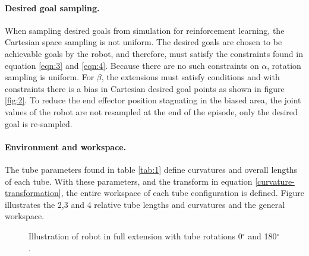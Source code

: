 \paragraph{Desired goal sampling.} When sampling desired goals from simulation for reinforcement learning, the Cartesian space sampling is not uniform. The desired goals are chosen to be achievable goals by the robot, and therefore, must satisfy the constraints found in equation \ref{eqn:3} and \ref{eqn:4}. Because there are no such constraints on $\alpha$, rotation sampling is uniform. For $\beta$, the extensions must satisfy conditions and with constraints there is a bias in Cartesian desired goal points as shown in figure \ref{fig:2}. To reduce the end effector position stagnating in the biased area, the joint values of the robot are not resampled at the end of the episode, only the desired goal is re-sampled.

\paragraph{Environment and workspace.} The tube parameters found in table \ref{tab:1} define curvatures and overall lengths of each tube. With these parameters, and the transform in equation \ref{curvature-transformation}, the entire workspace of each tube configuration is defined. Figure illustrates the 2,3 and 4 relative tube lengths and curvatures and the general workspace.

\begin{figure}
    
    \caption{Illustration of robot in full extension with tube rotations 0$^{\circ}$ and 180$^{\circ}$.}
    \label{fig:workspace}
\end{figure}

